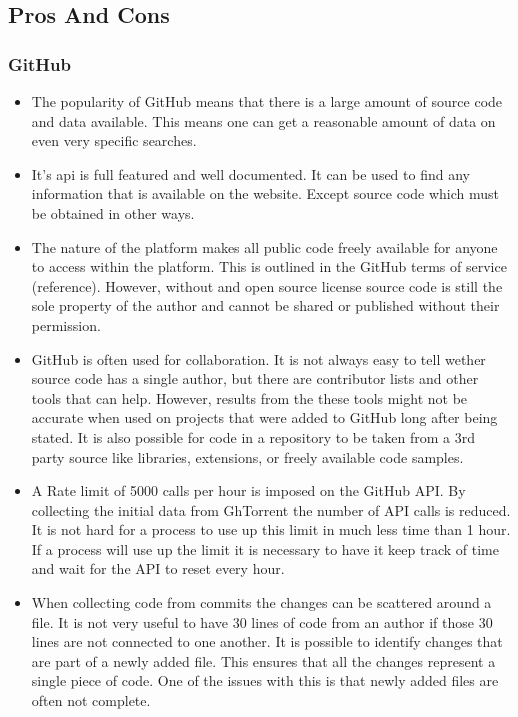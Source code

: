 \documentclass{article}
\begin{document}
\subsection{Pros And Cons}
\subsubsection*{GitHub}
\begin{itemize}
    \item The popularity of GitHub means that there is a large amount of source code and data available. This means one can get a reasonable amount of data on even very specific searches.

    \item It's api is full featured and well documented. It can be used to find any information that is available on the website. Except source code which must be obtained in other ways.
    
    \item The nature of the platform makes all public code freely available for anyone to access within the platform. This is outlined in the GitHub terms of service (reference). However, without and open source license source code is still the sole property of the author and cannot be shared or published without their permission.

    \item GitHub is often used for collaboration. It is not always easy to tell wether source code has a single author, but there are contributor lists and other tools that can help. However, results from the these tools might not be accurate when used on projects that were added to GitHub long after being stated. It is also possible for code in a repository to be taken from a 3rd party source like libraries, extensions, or freely available code samples.

    \item A Rate limit of 5000 calls per hour is imposed on the GitHub API. By collecting the initial data from GhTorrent the number of API calls is reduced. It is not hard for a process to use up this limit in much less time than 1 hour. If a process will use up the limit it is necessary to have it keep track of time and wait for the API to reset every hour.

    \item When collecting code from commits the changes can be scattered around a file. It is not very useful to have 30 lines of code from an author if those 30 lines are not connected to one another. It is possible to identify changes that are part of a newly added file. This ensures that all the changes represent a single piece of code. One of the issues with this is that newly added files are often not complete.
\end{itemize}
\end{document}
